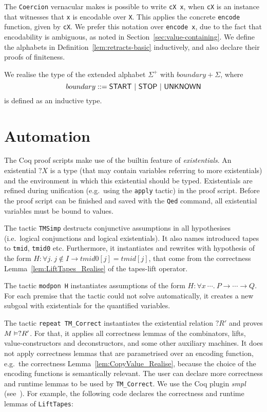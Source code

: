 The \lstinline!Coercion! vernacular makes is possible to write \lstinline!cX x!, when \lstinline!cX! is an instance that witnesses that \lstinline!x!
is encodable over \lstinline!X!.  This applies the concrete \lstinline!encode! function, given by \lstinline!cX!.  We prefer this notation over
\lstinline!encode x!, due to the fact that encodability is ambiguous, as noted in Section~\ref{sec:value-containing}.  We define the alphabets in
Definition~\ref{lem:retracts-basic} inductively, and also declare their proofs of finiteness.

We realise the type of the extended alphabet $\Sigma^+$ with $boundary + \Sigma$, where
\[ boundary ::= \mathsf{START} ~|~ \mathsf{STOP} ~|~ \mathsf{UNKNOWN} \]%
is defined as an inductive type.


\section{Automation}
\label{sec:coq-automation}

The Coq proof scripts make use of the builtin feature of \textit{existentials}.  An existential $?X$ is a type (that may contain variables referring
to more existentials) and the environment in which this existential should be typed.  Existentials are refined during unification (e.g.\ using the
\lstinline!apply! tactic) in the proof script.  Before the proof script can be finished and saved with the \lstinline!Qed! command, all existential
variables must be bound to values.

The tactic \lstinline!TMSimp! destructs conjunctive assumptions in all hypothesises (i.e.\ logical conjunctions and logical existentials).  It also
names introduced tapes to \lstinline!tmid!, \lstinline!tmid0! etc.  Furthermore, it instantiates and rewrites with hypothesis of the form
$H: \forall j.~ j \notin I \rightarrow tmid0[j] = tmid[j]$, that come from the correctness Lemma~\ref{lem:LiftTapes_Realise} of the tapes-lift
operator.

The tactic \lstinline!modpon H! instantiates assumptions of the form $H: \forall x~\cdots.~P \rightarrow \cdots \rightarrow Q$.  For each premise that
the tactic could not solve automatically, it creates a new subgoal with existentials for the quantified variables.

The tactic \lstinline!repeat TM_Correct! instantiates the existential relation $?R'$ and proves $M \mathrel{\vDash} ?R'$.  For that, it applies all
correctness lemmas of the combinators, lifts, value-constructors and deconstructors, and some other auxiliary machines.  It does not apply correctness
lemmas that are parametrised over an encoding function, e.g.\ the correctness Lemma~\ref{lem:CopyValue_Realise}, because the choice of the encoding
functions is semantically relevant.  The user can declare more correctness and runtime lemmas to be used by \lstinline!TM_Correct!.  We use the Coq
plugin \textit{smpl} (see~\cite{SMPL}).  For example, the following code declares the correctness and runtime lemmas of \lstinline!LiftTapes!:

